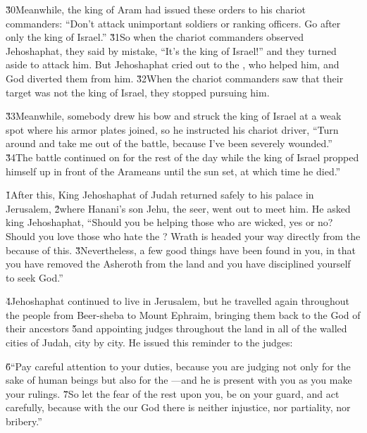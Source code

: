 \v{30}Meanwhile, the king of Aram had issued these orders to his chariot commanders: ``Don't attack unimportant soldiers or ranking officers. Go after only the king of Israel.'' \v{31}So when the chariot commanders observed Jehoshaphat, they said by mistake, ``It's the king of Israel!'' and they turned aside to attack him. But Jehoshaphat cried out to the , who helped him, and God diverted them from him. \v{32}When the chariot commanders saw that their target was not the king of Israel, they stopped pursuing him.

\v{33}Meanwhile, somebody drew his bow and struck the king of Israel at a weak spot where his armor plates joined, so he instructed his chariot driver, ``Turn around and take me out of the battle, because I've been severely wounded.'' \v{34}The battle continued on for the rest of the day while the king of Israel propped himself up in front of the Arameans until the sun set, at which time he died.''

\v{1}After this, King Jehoshaphat of Judah returned safely to his palace in Jerusalem, \v{2}where Hanani's son Jehu, the seer, went out to meet him. He asked king Jehoshaphat, ``Should you be helping those who are wicked, yes or no? Should you love those who hate the ? Wrath is headed your way directly from the  because of this. \v{3}Nevertheless, a few good things have been found in you, in that you have removed the Asheroth from the land and you have disciplined yourself to seek God.''

\v{4}Jehoshaphat continued to live in Jerusalem, but he travelled again throughout the people from Beer-sheba to Mount Ephraim, bringing them back to the  God of their ancestors \v{5}and appointing judges throughout the land in all of the walled cities of Judah, city by city. He issued this reminder to the judges:

\begin{poetry}
\poeml \v{6}``Pay careful attention to your duties, because you are judging not only for the sake of human beings but also for the ---and he is present with you as you make your rulings. \v{7}So let the fear of the  rest upon you, be on your guard, and act carefully, because with the  our God there is neither injustice, nor partiality, nor bribery.''
\end{poetry}

